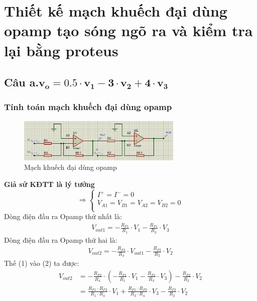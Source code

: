\documentclass[12pt,a4paper]{article}
\begin{document}
    
	\tableofcontents
	\newpage
	\section{Thiết kế mạch khuếch đại dùng opamp tạo sóng ngõ ra và kiểm tra lại bằng proteus}	
		\subsection{Câu a.$\mathbf{v_o = 0.5 \cdot v_1 - 3 \cdot v_2 + 4 \cdot v_3}$}
			\subsubsection{Tính toán mạch khuếch đại dùng opamp}
				\begin{figure}[H]
					\centering
					\includegraphics[width=0.7\textwidth]{pictures/topic1_a.png}
					\caption{Mạch khuếch đại dùng opamp}					
					\label{fig:circuit_simulation}
				\end{figure}
				\hspace*{0.6cm}\textbf{Giả sử KĐTT là lý tưởng}
				\[
				\Rightarrow
				\begin{cases}
					I^+ = I^- = 0\\
					V_{A1} = V_{B1} = V_{A2} = V_{B2} = 0\\
				\end{cases}
				\]
				\hspace*{0.6cm}Dòng điện đầu ra Opamp thứ nhất là:
				\begin{align}
					V_{out1} = -\frac{R_{F1}}{R_1} \cdot V_1 - \frac{R_{F1}}{R_3} \cdot V_3 
				\end{align}
				\hspace*{0.6cm}Dòng điện đầu ra Opamp thứ hai là:
				\begin{align}
					V_{out2} = -\frac{R_{F2}}{R_4} \cdot V_{out1} - \frac{R_{F2}}{R_2} \cdot V_2
				\end{align}
				\hspace*{0.6cm}Thế (1) vào (2) ta được: 
				\begin{align*}
					V_{out2} &= -\frac{R_{F2}}{R_4} \cdot \left(-\frac{R_{F1}}{R_1} \cdot V_1 - \frac{R_{F1}}{R_3} \cdot V_3\right) - \frac{R_{F2}}{R_2} \cdot V_2 \\
							&= \frac{R_{F1} \cdot R_{F2}}{R_1 \cdot R_4} \cdot V_1 + \frac{R_{F1} \cdot R_{F2}}{R_3 \cdot R_4} \cdot V_3 - \frac{R_{F2}}{R_2} \cdot V_2
				\end{align*}
\end{document}
